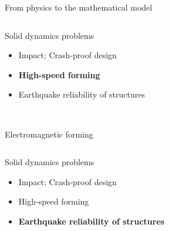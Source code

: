 \begin{frame}{From physics to the mathematical model}
\begin{overprint}
    \begin{columns}
      \begin{column}{0.45\textwidth}
        \begin{block}{Solid dynamics problems}
          \begin{itemize}
          \item[] Impact; Crash-proof design
          \item[] \textbf{High-speed forming}
          \item[] Earthquake reliability of structures 
          \end{itemize}
        \end{block}
      \end{column}
      
      \begin{column}{0.55\textwidth}
      \end{column}
    \end{columns}
    \centering
      \\
    \scriptsize Electromagnetic forming \cite{Guillaume}
    
    

    \begin{columns}
      \begin{column}{0.45\textwidth}
        \begin{block}{Solid dynamics problems}
          \begin{itemize}
          \item[] Impact; Crash-proof design
          \item[] High-speed forming
          \item[] \textbf{Earthquake reliability of structures}
          \end{itemize}
        \end{block}
      \end{column}
      

\end{columns}
\end{overprint}
\end{frame}
